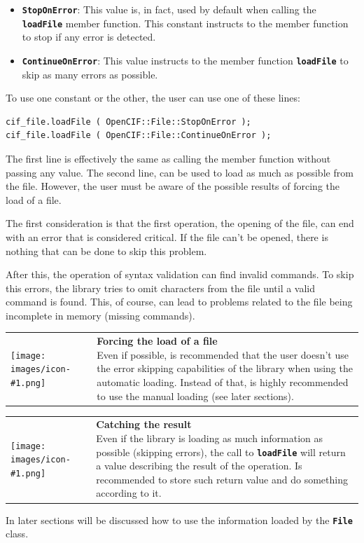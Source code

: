 \documentclass[11pt,twoside,openany,x11names,svgnames]{memoir}
\makeatletter
\newcommand{\IconNote}[3]
{
	\begin{table}[ht]
	\begin{tabular}{ lm{\dimexpr\textwidth-8\tabcolsep-\wd0}@{}}
		\toprule
		\texttt{[image: images/icon-\#1.png]}
		&
		\parbox[t]{155mm}{
		\textbf{#2} \\
		#3
		}
	\end{tabular}
\end{table}
}
\makeatother
\begin{document}
\begin{itemize}
	\item \textbf{\texttt{StopOnError}}: This value is, in fact, used by default when calling the \textbf{\texttt{loadFile}} member function. This constant instructs to the member function to stop if any error is detected.
	
	\item \textbf{\texttt{ContinueOnError}}: This value instructs to the member function \textbf{\texttt{loadFile}} to skip as many errors as possible.
\end{itemize}

To use one constant or the other, the user can use one of these lines:

\begin{lstlisting}[frame=single,style=CPPStyle]
cif_file.loadFile ( OpenCIF::File::StopOnError );
cif_file.loadFile ( OpenCIF::File::ContinueOnError );
\end{lstlisting}

The first line is effectively the same as calling the member function without passing any value. The second line, can be used to load as much as possible from the file. However, the user must be aware of the possible results of forcing the load of a file.

The first consideration is that the first operation, the opening of the file, can end with an error that is considered critical. If the file can't be opened, there is nothing that can be done to skip this problem.

After this, the operation of syntax validation can find invalid commands. To skip this errors, the library tries to omit characters from the file until a valid command is found. This, of course, can lead to problems related to the file being incomplete in memory (missing commands).

\IconNote
	{error}
	{Forcing the load of a file}
	{Even if possible, is recommended that the user doesn't use the error skipping capabilities of the library when using the automatic loading. Instead of that, is highly recommended to use the manual loading (see later sections).}
	
\IconNote
	{info}
	{Catching the result}
	{Even if the library is loading as much information as possible (skipping errors), the call to \textbf{\texttt{loadFile}} will return a value describing the result of the operation. Is recommended to store such return value and do something according to it.}
	
In later sections will be discussed how to use the information loaded by the \textbf{\texttt{File}} class.
\end{document}
